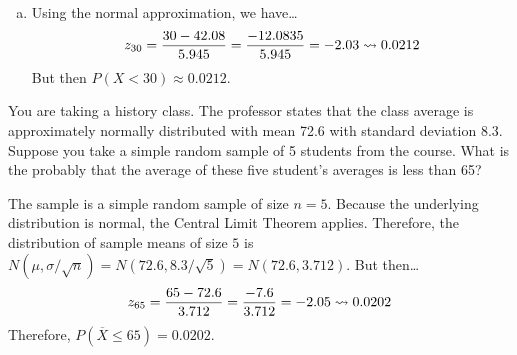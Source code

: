 \documentclass[12pt,letterpaper]{exam}
\begin{document}
\begin{questions}
\begin{enumerate}[(a)]
\item Using the normal approximation, we have\dots
	\[
	z_{30}= \dfrac{30 - 42.08}{5.945}= \dfrac{-12.0835}{5.945}= -2.03 \rightsquigarrow 0.0212
	\]
But then $P(X < 30) \approx 0.0212$. 
\end{enumerate}



\newpage
\question[10] You are taking a history class. The professor states that the class average is approximately normally distributed with mean 72.6 with standard deviation 8.3. Suppose you take a simple random sample of 5 students from the course. What is the probably that the average of these five student's averages is less than 65? \pspace

\sol The sample is a simple random sample of size $n= 5$. Because the underlying distribution is normal, the Central Limit Theorem applies. Therefore, the distribution of sample means of size $5$ is $N(\mu, \sigma/\sqrt{n})= N(72.6, 8.3/\sqrt{5})= N(72.6, 3.712)$. But then\dots
	\[
	z_{65}= \dfrac{65 - 72.6}{3.712}= \dfrac{-7.6}{3.712}= -2.05 \rightsquigarrow 0.0202
	\]
Therefore, $P(\overline{X} \leq 65)= 0.0202$. 


\end{questions}
\end{document}
